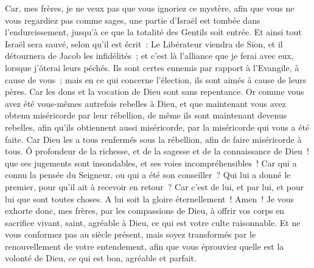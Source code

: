 \begin{multicols}{2}
Car, mes frères, je ne veux pas que vous ignoriez ce mystère, afin que vous ne vous regardiez pas comme sages, une partie d'Israël est tombée dans l'endurcissement, jusqu'à ce que la totalité des Gentils soit entrée.
Et ainsi tout Israël sera sauvé, selon qu'il est écrit~: Le Libérateur viendra de Sion, et il détournera de Jacob les infidélités~;
et c'est là l'alliance que je ferai avec eux, lorsque j'ôterai leurs péchés.
Ils sont certes ennemis par rapport à l'Evangile, à cause de vous~; mais en ce qui concerne l'élection, ils sont aimés à cause de leurs pères.
Car les dons et la vocation de Dieu sont sans repentance.
Or comme vous avez été vous-mêmes autrefois rebelles à Dieu, et que maintenant vous avez obtenu miséricorde par leur rébellion,
de même ils sont maintenant devenus rebelles, afin qu'ils obtiennent aussi miséricorde, par la miséricorde qui vous a été faite.
Car Dieu les a tous renfermés sous la rébellion, afin de faire miséricorde à tous.
Ô profondeur de la richesse, et de la sagesse et de la connaissance de Dieu~! que ses jugements sont insondables, et ses voies incompréhensibles~!
Car qui a connu la pensée du Seigneur, ou qui a été son conseiller~?
Qui lui a donné le premier, pour qu'il ait à recevoir en retour~?
Car c'est de lui, et par lui, et pour lui que sont toutes choses. A lui soit la gloire éternellement~! Amen~!
\VerseOne{}Je vous exhorte donc, mes frères, par les compassions de Dieu, à offrir vos corps en sacrifice vivant, saint, agréable à Dieu, ce qui est votre culte raisonnable.
Et ne vous conformez pas au siècle présent, mais soyez transformés par le renouvellement de votre entendement, afin que vous éprouviez quelle est la volonté de Dieu, ce qui est bon, agréable et parfait.

\end{multicols}
